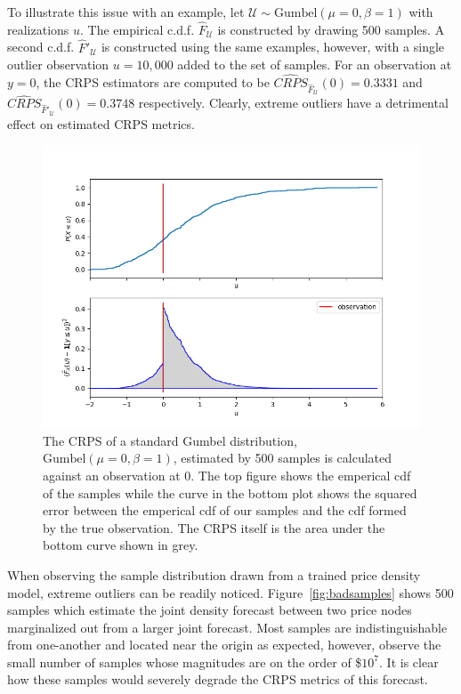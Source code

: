 To illustrate this issue with an example, let $\mathcal{U} \sim \text{Gumbel}(\mu=0, \beta=1)$ with realizations $u$.
The empirical c.d.f. $\hat{F}_\mathcal{U}$ is constructed by drawing 500 samples.
A second c.d.f. $\hat{F}'_\mathcal{U}$ is constructed using the same examples, however, with a single outlier observation
$u=10,000$ added to the set of samples.
For an observation at $y=0$, the CRPS estimators are computed to be $\widehat{CRPS}_{\hat{F}_\mathcal{U}}(0) = 0.3331$
and $\widehat{CRPS}_{\hat{F}'_\mathcal{U}}(0) = 0.3748$ respectively.
Clearly, extreme outliers have a detrimental effect on estimated CRPS metrics.

\begin{figure}[htbp]
    \caption[Example CRPS calculation of a standard Gumbel distribution]{
        The CRPS of a standard Gumbel distribution, $\text{Gumbel}(\mu=0, \beta=1)$, estimated by 500 samples is
        calculated against an observation at $0$.
        The top figure shows the emperical cdf of the samples while the curve in the bottom plot shows the squared error
        between the emperical cdf of our samples and the cdf formed by the true observation.
        The CRPS itself is the area under the bottom curve shown in grey.
    }
    \begin{center}
        \setlength{\fboxsep}{0pt}%
        \setlength{\fboxrule}{1pt}%
        \includegraphics[width=120mm]{figs/gumbel_crps}
    \end{center}
    \label{fig:gumbel_crps}
\end{figure}

When observing the sample distribution drawn from a trained price density model, extreme outliers can be readily noticed.
Figure~\ref{fig:badsamples} shows 500 samples which estimate the joint density forecast between two price nodes
marginalized out from a larger joint forecast.
Most samples are indistinguishable from one-another and located near the origin as expected, however,
observe the small number of samples whose magnitudes are on the order of \$$10^7$.
It is clear how these samples would severely degrade the CRPS metrics of this forecast.

